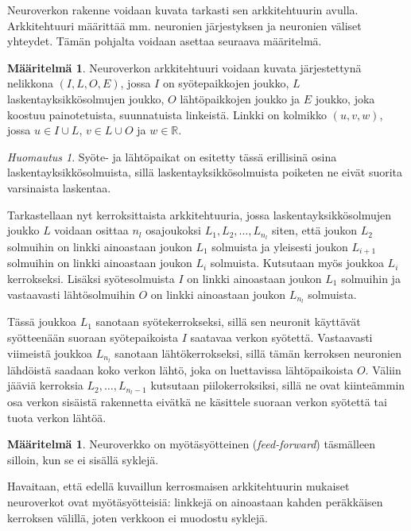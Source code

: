 \documentclass[12pt,a4paper,finnish,oneside,titlepage]{article}
\newcommand{\field}[1]{\mathbb{#1}}    %
\newcommand{\R}{\field{R}}             %
\theoremstyle{plain}
\theoremstyle{definition}
\newtheorem{maar}[lause]{Määritelmä}   %
\theoremstyle{remark}
\newtheorem{huom}[lause]{Huomautus}    %
\begin{document}
Neuroverkon rakenne voidaan kuvata tarkasti sen arkkitehtuurin avulla. Arkkitehtuuri määrittää mm. neuronien järjestyksen ja neuronien väliset yhteydet. Tämän pohjalta voidaan asettaa seuraava määritelmä.

\begin{maar}\label{maar:arc}
Neuroverkon arkkitehtuuri voidaan kuvata järjestettynä nelikkona \((I, L, O, E)\), jossa \(I\) on syötepaikkojen joukko, \(L\) laskentayksikkösolmujen joukko, \(O\) lähtöpaikkojen joukko ja \(E\) joukko, joka koostuu painotetuista, suunnatuista linkeistä. Linkki on kolmikko \((u, v, w)\), jossa \(u\in I\cup L\), \(v\in L\cup O\) ja \(w\in \R\). \cite{net}
\end{maar}

\begin{huom}
Syöte- ja lähtöpaikat on esitetty tässä erillisinä osina laskentayksikkösolmuista, sillä laskentayksikkösolmuista poiketen ne eivät suorita varsinaista laskentaa.
\end{huom}

Tarkastellaan nyt kerroksittaista arkkitehtuuria, jossa laskentayksikkösolmujen joukko \(L\) voidaan osittaa \(n_l\) osajoukoksi \(L_1, L_2, \ldots, L_{n_l}\) siten, että joukon \(L_2\) solmuihin on linkki ainoastaan joukon \(L_1\) solmuista ja yleisesti joukon \(L_{i+1}\) solmuihin on linkki ainoastaan joukon \(L_{i}\) solmuista. Kutsutaan myös joukkoa \(L_i\) kerrokseksi. Lisäksi syötesolmuista \(I\) on linkki ainoastaan joukon \(L_1\) solmuihin ja vastaavasti lähtösolmuihin \(O\) on linkki ainoastaan joukon \(L_{n_l}\) solmuista.

Tässä joukkoa \(L_1\) sanotaan syötekerrokseksi, sillä sen neuronit käyttävät syötteenään suoraan syötepaikoista \(I\) saatavaa verkon syötettä. Vastaavasti viimeistä joukkoa \(L_{n_l}\) sanotaan lähtökerrokseksi, sillä tämän kerroksen neuronien lähdöistä saadaan koko verkon lähtö, joka on luettavissa lähtöpaikoista \(O\). Väliin jääviä kerroksia \(L_2, \ldots, L_{n_l-1}\) kutsutaan piilokerroksiksi, sillä ne ovat kiinteämmin osa verkon sisäistä rakennetta eivätkä ne käsittele suoraan verkon syötettä tai tuota verkon lähtöä.

\begin{maar}\label{maar:grad}
Neuroverkko on myötäsyötteinen (\textit{feed-forward}) täsmälleen silloin, kun se ei sisällä syklejä.
\end{maar}

Havaitaan, että edellä kuvaillun kerrosmaisen arkkitehtuurin mukaiset neuroverkot ovat myötäsyötteisiä: linkkejä on ainoastaan kahden peräkkäisen kerroksen välillä, joten verkkoon ei muodostu syklejä.
\end{document}
